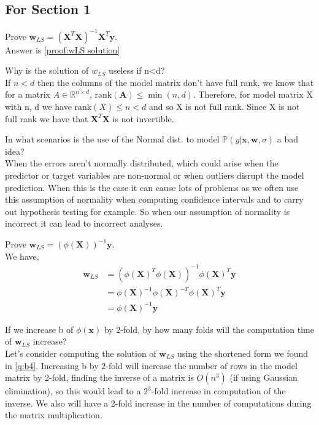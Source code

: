 \begin{appendices}
\subsection{For Section 1}
\begin{question}
    Prove $\bm{w}_{LS} = (\bm{X}^{T} \bm{X})^{-1} \bm{X}^{T} \bm{y}$. \\
    Answer is \cref{proof:wLS solution}
\end{question}

\begin{question}
    Why is the solution of $w_{LS}$ useless if n<d? \\
    If $n<d$ then the columns of the model matrix don't have full rank, we know that for a matrix $A \in \mathbb{R}^{n \times d} $, $\text{rank}(\bm{A}) \leq \min(n,d)$. Therefore, for model matrix X with n, d we have $\text{rank}(X) \leq n < d$ and so X is not full rank. Since X is not full rank we have that $\bm{X}^{T} \bm{X}$ is not invertible.
\end{question}

\begin{question}
    In what scenarios is the use of the Normal dist. to model $\mathbb{P}(y|\bm{x},\bm{w},\sigma)$ a bad idea? \\
    When the errors aren't normally distributed, which could arise when the predictor or target variables are non-normal or when outliers disrupt the model prediction. 
    When this is the case it can cause lots of problems as we often use this assumption of normality when computing confidence intervals and to carry out hypothesis testing for example. So when our assumption of normality is incorrect it can lead to incorrect analyses. 
\end{question}

\begin{question}\label{q:b4}
    Prove $\bm{w}_{LS} = (\phi(\bm{X}))^{-1} \bm{y}$. \\
    We have,
    \begin{align}
        \bm{w}_{LS} {}& = (\phi(\bm{X})^{T} \phi(\bm{X}))^{-1} \phi(\bm{X})^{T} \bm{y} \\
        & = \phi(\bm{X})^{-1} \phi(\bm{X})^{-T} \phi(\bm{X})^{T} \bm{y} \\
        & = \phi(\bm{X})^{-1} \bm{y}
    \end{align}
\end{question}

\begin{question}
    If we increase b of $\phi(\bm{x})$ by 2-fold, by how many folds will the computation time of $\bm{w}_{LS}$ increase? \\
    Let's consider computing the solution of $\bm{w}_{LS}$ using the shortened form we found in \cref{q:b4}.
    Increasing b by 2-fold will increase the number of rows in the model matrix by 2-fold, finding the inverse of a matrix is $O(n^{3})$ (if using Gaussian elimination), so this would lead to a $2^{3}$-fold increase in computation of the inverse. We also will have a 2-fold increase in the number of computations during the matrix multiplication.
\end{question}


\end{appendices}
